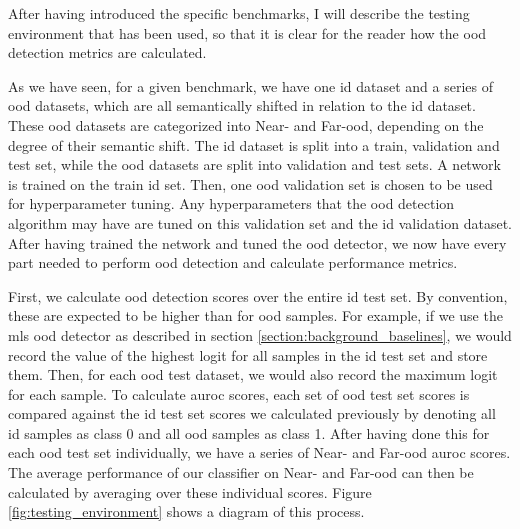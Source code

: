 \documentclass[UKenglish]{uiomasterthesis} %
\theoremstyle{definition}
\begin{document}
After having introduced the specific benchmarks, I will describe the testing environment that has been used, so that it is clear for the reader how the \ac{ood} detection metrics are calculated.

As we have seen, for a given benchmark, we have one \ac{id} dataset and a series of \ac{ood} datasets, which are all semantically shifted in relation to the \ac{id} dataset. These \ac{ood} datasets are categorized into Near- and Far-\ac{ood}, depending on the degree of their semantic shift. The \ac{id} dataset is split into a train, validation and test set, while the \ac{ood} datasets are split into validation and test sets. A network is trained on the train \ac{id} set.  Then, one \ac{ood} validation set is chosen to be used for hyperparameter tuning. Any hyperparameters that the \ac{ood} detection algorithm may have are tuned on this validation set and the \ac{id} validation dataset. After having trained the network and tuned the \ac{ood} detector, we now have every part needed to perform \ac{ood} detection and calculate performance metrics.

First, we calculate \ac{ood} detection scores over the entire \ac{id} test set. By convention, these are expected to be higher than for \ac{ood} samples. For example, if we use the \ac{mls} \ac{ood} detector as described in section \ref{section:background_baselines}, we would record the value of the highest logit for all samples in the \ac{id} test set and store them. Then, for each \ac{ood} test dataset, we would also record the maximum logit for each sample. To calculate \ac{auroc} scores, each set of \ac{ood} test set scores is compared against the \ac{id} test set scores we calculated previously by denoting all \ac{id} samples as class 0 and all \ac{ood} samples as class 1. After having done this for each \ac{ood} test set individually, we have a series of Near- and Far-\ac{ood} \ac{auroc} scores. The average performance of our classifier on Near- and Far-\ac{ood} can then be calculated by averaging over these individual scores.  Figure \ref{fig:testing_environment} shows a diagram of this process.
\end{document}
